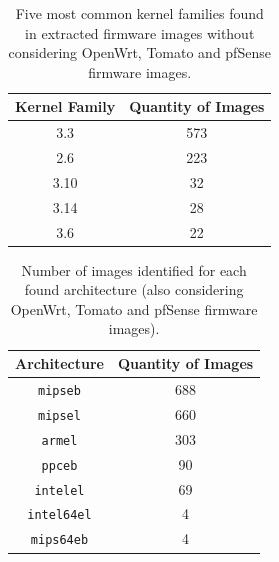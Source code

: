 \begin{table}[H]
\centering
\caption{Five most common kernel families found in extracted firmware images without considering OpenWrt, Tomato and pfSense firmware images.}
\begin{tabular}{cc}
\hline
\textbf{Kernel Family} & \textbf{Quantity of Images} \\ \hline
3.3                     & 573                \\ 
2.6                     & 223                \\ 
3.10                    &  32                \\ 
3.14                    &  28                \\ 
3.6                     &  22                \\ \hline
\end{tabular}
\label{tab:kernel-family-stats}
\end{table}


\begin{table}[H]
\centering
\caption{Number of images identified for each found architecture (also considering OpenWrt, Tomato and pfSense firmware images).}
\begin{tabular}{cc}
\hline
\textbf{Architecture}       & \textbf{Quantity of Images} \\ \hline
{\tt mipseb}                & 688                         \\ 
{\tt mipsel}                & 660                         \\ 
{\tt armel}                 & 303                         \\ 
{\tt ppceb}                 & 90                          \\ 
{\tt intelel}               & 69                          \\ 
{\tt intel64el}             & 4                           \\ 
{\tt mips64eb}              & 4                           \\ \hline
\end{tabular}
\label{tab:arch-stats-openwrt}
\end{table}

